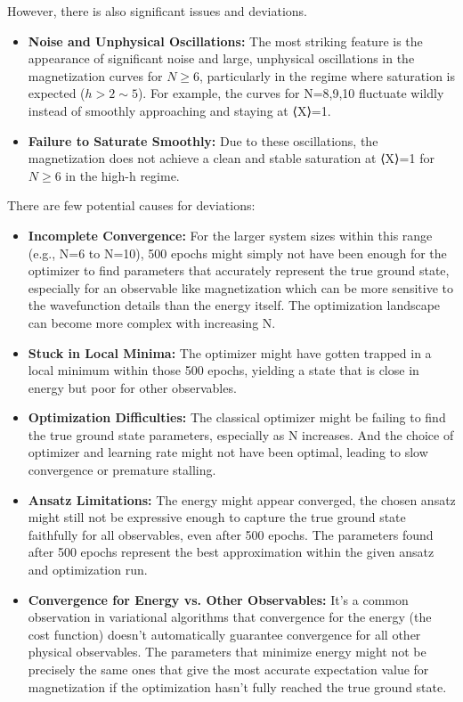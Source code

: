 \documentclass[pre,twocolumn,floatfix]{revtex4-1}
\begin{document}
However, there is also significant issues and deviations. 
\begin{itemize}
    \item \textbf{Noise and Unphysical Oscillations:} The most striking feature is the appearance of significant noise and large, unphysical oscillations in the magnetization curves for $N\geq 6$, particularly in the regime where saturation is expected ($h>2\sim5$). For example, the curves for N=8,9,10 fluctuate wildly instead of smoothly approaching and staying at ⟨X⟩=1.
    \item \textbf{Failure to Saturate Smoothly:} Due to these oscillations, the magnetization does not achieve a clean and stable saturation at ⟨X⟩=1 for $N\geq6$ in the high-h regime.
\end{itemize}

There are few potential causes for deviations: 
\begin{itemize}
    \item \textbf{Incomplete Convergence:} For the larger system sizes within this range (e.g., N=6 to N=10), 500 epochs might simply not have been enough for the optimizer to find parameters that accurately represent the true ground state, especially for an observable like magnetization which can be more sensitive to the wavefunction details than the energy itself. The optimization landscape can become more complex with increasing N.
    \item \textbf{Stuck in Local Minima:} The optimizer might have gotten trapped in a local minimum within those 500 epochs, yielding a state that is close in energy but poor for other observables.
    \item \textbf{Optimization Difficulties:} The classical optimizer might be failing to find the true ground state parameters, especially as N increases. And the choice of optimizer and learning rate might not have been optimal, leading to slow convergence or premature stalling.
    \item \textbf{Ansatz Limitations:} The energy might appear converged, the chosen ansatz might still not be expressive enough to capture the true ground state faithfully for all observables, even after 500 epochs. The parameters found after 500 epochs represent the best approximation within the given ansatz and optimization run.
    \item \textbf{Convergence for Energy vs. Other Observables:} It's a common observation in variational algorithms that convergence for the energy (the cost function) doesn't automatically guarantee convergence for all other physical observables. The parameters that minimize energy might not be precisely the same ones that give the most accurate expectation value for magnetization if the optimization hasn't fully reached the true ground state.
\end{itemize}
\end{document}
